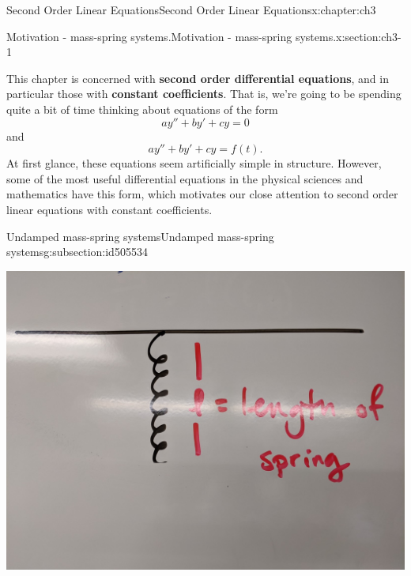 \documentclass[oneside,10pt,]{book}
\newcommand{\terminology}[1]{\textbf{#1}}
\numberwithin{equation}{section}
\numberwithin{equation}{section}
\begin{document}
\begin{chapterptx}{Second Order Linear Equations}{}{Second Order Linear Equations}{}{}{x:chapter:ch3}
%
%
\typeout{************************************************}
\typeout{************************************************}
%
\begin{sectionptx}{Motivation - mass-spring systems.}{}{Motivation - mass-spring systems.}{}{}{x:section:ch3-1}
\begin{introduction}{}%
This chapter is concerned with \terminology{second order differential equations}, and in particular those with \terminology{constant coefficients}. That is, we're going to be spending quite a bit of time thinking about equations of the form%
\begin{equation*}
a y'' + b y' + c y = 0
\end{equation*}
and%
\begin{equation*}
a y'' + b y' + c y = f(t).
\end{equation*}
At first glance, these equations seem artificially simple in structure. However, some of the most useful differential equations in the physical sciences and mathematics have this form, which motivates our close attention to second order linear equations with constant coefficients.%
\end{introduction}%
%
%
\typeout{************************************************}
\typeout{************************************************}
%
\begin{subsectionptx}{Undamped mass-spring systems}{}{Undamped mass-spring systems}{}{}{g:subsection:id505534}
\begin{image}{0}{1}{0}%
\includegraphics[width=\linewidth]{images/spring_no_mass.jpg}

\end{image}
\end{subsectionptx}
\end{sectionptx}
\end{chapterptx}
\end{document}
